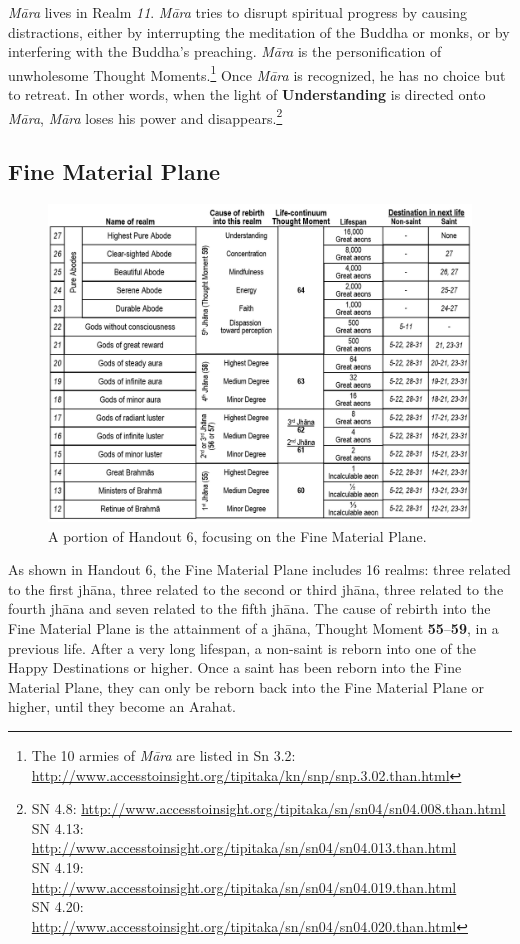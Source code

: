 \textit{Māra} lives in Realm \textit{11}. \textit{Māra} tries to disrupt spiritual progress by causing distractions, either by interrupting the meditation of the Buddha or monks, or by interfering with the Buddha’s preaching. \textit{Māra} is the personification of unwholesome Thought Moments.\footnote{The 10 armies of \textit{Māra} are listed in Sn 3.2: \url{http://www.accesstoinsight.org/tipitaka/kn/snp/snp.3.02.than.html}} Once \textit{Māra} is recognized, he has no choice but to retreat. In other words, when the light of \textbf{Understanding} is directed onto \textit{Māra}, \textit{Māra} loses his power and disappears.\footnote{SN 4.8: \url{http://www.accesstoinsight.org/tipitaka/sn/sn04/sn04.008.than.html}\\SN 4.13: \url{http://www.accesstoinsight.org/tipitaka/sn/sn04/sn04.013.than.html}\\SN 4.19: \url{http://www.accesstoinsight.org/tipitaka/sn/sn04/sn04.019.than.html}\\SN 4.20: \url{http://www.accesstoinsight.org/tipitaka/sn/sn04/sn04.020.than.html}}

\subsection*{Fine Material Plane}

\begin{figure}[h]
\centering
\includegraphics[width=0.9\linewidth]{./Diagrams/Fine1}
\caption{A portion of Handout 6, focusing on the Fine Material Plane.}
\label{fig:Fine1}
\end{figure}

As shown in Handout 6, the Fine Material Plane includes 16 realms: three related to the first jhāna, three related to the second or third jhāna, three related to the fourth jhāna and seven related to the fifth jhāna. The cause of rebirth into the Fine Material Plane is the attainment of a jhāna, Thought Moment \textbf{55}--\textbf{59}, in a previous life. After a very long lifespan, a non-saint is reborn into one of the Happy Destinations or higher. Once a saint has been reborn into the Fine Material Plane, they can only be reborn back into the Fine Material Plane or higher, until they become an Arahat.

